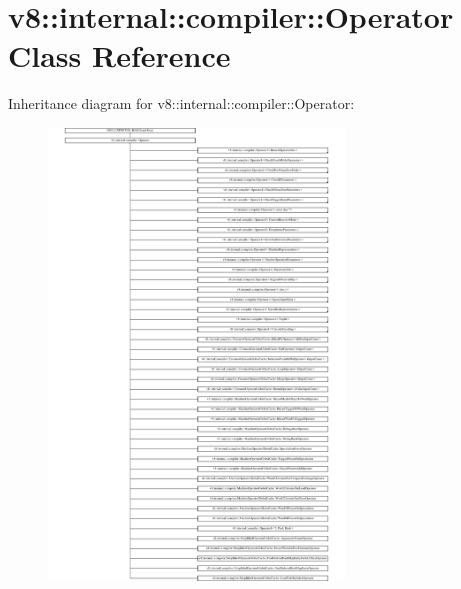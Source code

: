 \hypertarget{classv8_1_1internal_1_1compiler_1_1Operator}{}\section{v8\+:\+:internal\+:\+:compiler\+:\+:Operator Class Reference}
\label{classv8_1_1internal_1_1compiler_1_1Operator}
Inheritance diagram for v8\+:\+:internal\+:\+:compiler\+:\+:Operator\+:\begin{figure}[H]
\begin{center}
\leavevmode
\includegraphics[height=12.000000cm]{classv8_1_1internal_1_1compiler_1_1Operator}
\end{center}
\end{figure}
